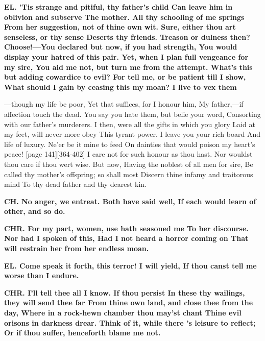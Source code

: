\documentclass[11pt,letter]{book}
\begin{document}
\par \textbf{EL. ’Tis strange and pitiful, thy father’s child Can leave him in oblivion and subserve The mother. All thy schooling of me springs From her suggestion, not of thine own wit. Sure, either thou art senseless, or thy sense Deserts thy friends. Treason or dulness then? Choose!—You declared but now, if you had strength, You would display your hatred of this pair. Yet, when I plan full vengeance for my sire, You aid me not, but turn me from the attempt. What’s this but adding cowardice to evil? For tell me, or be patient till I show, What should I gain by ceasing this my moan? I live to vex them}
\par  —though my life be poor, Yet that suffices, for I honour him, My father,—if affection touch the dead. You say you hate them, but belie your word, Consorting with our father’s murderers. I then, were all the gifts in which you glory Laid at my feet, will never more obey This tyrant power. I leave you your rich board And life of luxury. Ne’er be it mine to feed On dainties that would poison my heart’s peace! [page 141][364-402] I care not for such honour as thou hast. Nor wouldst thou care if thou wert wise. But now, Having the noblest of all men for sire, Be called thy mother’s offspring; so shall most Discern thine infamy and traitorous mind To thy dead father and thy dearest kin.

\par \textbf{CH. No anger, we entreat. Both have said well, If each would learn of other, and so do.}
\par 

\par \textbf{CHR. For my part, women, use hath seasoned me To her discourse. Nor had I spoken of this, Had I not heard a horror coming on That will restrain her from her endless moan.}
\par 

\par \textbf{EL. Come speak it forth, this terror! I will yield, If thou canst tell me worse than I endure.}
\par 

\par \textbf{CHR. I’ll tell thee all I know. If thou persist In these thy wailings, they will send thee far From thine own land, and close thee from the day, Where in a rock-hewn chamber thou may’st chant Thine evil orisons in darkness drear. Think of it, while there ’s leisure to reflect; Or if thou suffer, henceforth blame me not.}
\par 
\end{document}
